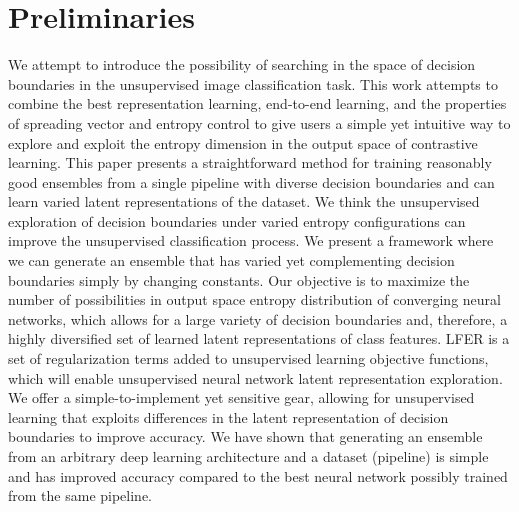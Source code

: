 \documentclass[journal]{journal}
\begin{document}
\section{Preliminaries}
We attempt to introduce the possibility of searching in the space of decision boundaries in the unsupervised image classification task. This work attempts to combine the best representation learning, end-to-end learning, and the properties of spreading vector and entropy control to give users a simple yet intuitive way to explore and exploit the entropy dimension in the output space of contrastive learning.
This paper presents a straightforward method for training reasonably good ensembles from a single pipeline with diverse decision boundaries and can learn varied latent representations of the dataset. We think the unsupervised exploration of decision boundaries under varied entropy configurations can improve the unsupervised classification process. We present a framework where we can generate an ensemble that has varied yet complementing decision boundaries simply by changing constants. Our objective is to maximize the number of possibilities in output space entropy distribution of converging neural networks, which allows for a large variety of decision boundaries and, therefore, a highly diversified set of learned latent representations of class features.
LFER is a set of regularization terms added to unsupervised learning objective functions, which will enable unsupervised neural network latent representation exploration. We offer a simple-to-implement yet sensitive gear, allowing for unsupervised learning that exploits differences in the latent representation of decision boundaries to improve accuracy. We have shown that generating an ensemble from an arbitrary deep learning architecture and a dataset (pipeline) is simple and has improved accuracy compared to the best neural network possibly trained from the same pipeline.
\end{document}
